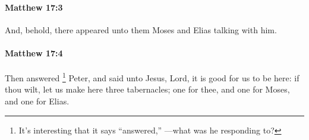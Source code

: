 		\paragraph{Matthew 17:3} %
			\label{MATTHEW-17-3}

			And, behold, there appeared unto them Moses and Elias talking with him.

			\begin{framed}
			\scriptsize
				\begin{compactdesc}
					\item[SBLG] 
				\end{compactdesc}
			\end{framed}

		\paragraph{Matthew 17:4} %
			\label{MATTHEW-17-4}

			Then answered%
				\footnote{%
					It's interesting that it says ``answered,'' ---what was he responding to?
					}
			Peter, and said unto Jesus, Lord, it is good for us to be here: if thou wilt, let us make here three tabernacles; one for thee, and one for Moses, and one for Elias.

